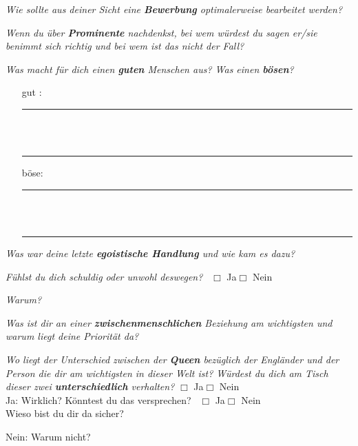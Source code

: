\documentclass[a4paper,12pt]{scrartcl}
\newcommand{\checkbox}{\(\Box\)}
\newcommand{\hfilloutline}[1]{\rule{#1}{0.5pt}}
\newcommand{\frage}[1]{\textit{#1}}
\renewcommand{\emph}[1]{\textbf{#1}}
\begin{document}
\frage{Wie sollte aus deiner Sicht eine \emph{Bewerbung} optimalerweise bearbeitet werden?}
\vspace{4cm}

\frage{Wenn du über \emph{Prominente} nachdenkst, bei wem würdest du sagen er/sie benimmt sich richtig und bei wem ist das nicht der Fall?}
\vspace{3cm}

\frage{Was macht für dich einen \emph{guten} Menschen aus? Was einen \emph{bösen}?}
\begin{enumerate}
    \item [gut :]\hfill\hfilloutline{15cm}\\ \\ \hfill\hfilloutline{15cm}
    \item [böse:]\hfill\hfilloutline{15cm}\\ \\ \hfill\hfilloutline{15cm}
\end{enumerate}
\vspace{1cm}

\frage{Was war deine letzte \emph{egoistische Handlung} und wie kam es dazu?}
\vspace{4cm}

\frage{Fühlst du dich schuldig oder unwohl deswegen?} \ \checkbox{} Ja\hspace{0.8cm}\checkbox{} Nein
\newpage

\frage{Warum?}
\vspace{3cm}

\frage{Was ist dir an einer \emph{zwischenmenschlichen} Beziehung am wichtigsten und warum liegt deine Priorität da?}
\vspace{4cm}

\frage{Wo liegt der Unterschied zwischen der \emph{Queen} bezüglich der Engländer und der Person die dir am wichtigsten in dieser Welt ist?
Würdest du dich am Tisch dieser zwei \emph{unterschiedlich} verhalten?}
\checkbox{} Ja\hspace{0.8cm}\checkbox{} Nein \\

Ja: Wirklich? Könntest du das versprechen? \ \checkbox{} Ja\hspace{0.8cm}\checkbox{} Nein \\
Wieso bist du dir da sicher?
\vspace{2cm}

Nein: Warum nicht? 
\vspace{3cm}
\end{document}
